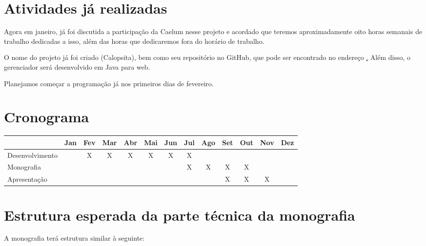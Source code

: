 \documentclass[titlepage]{article}
\begin{document}
\section{Atividades já realizadas}
Agora em janeiro, já foi discutida a participação da Caelum nesse projeto e acordado que teremos aproximadamente oito horas semanais de trabalho dedicadas a isso, além das horas que dedicaremos fora do horário de trabalho.

O nome do projeto já foi criado (Calopsita), bem como seu repositório no GitHub, que pode ser encontrado no endereço \href{git://github.com/caueguerra/calopsita.git}. Além disso, o gerenciador será desenvolvido em Java para web.

Planejamos começar a programação já nos primeiros dias de fevereiro.

\section{Cronograma}
\begin{tabular}{|l|c|c|c|c|c|c|c|c|c|c|c|c|}
  \hline
  & Jan & Fev & Mar & Abr & Mai & Jun & Jul & Ago & Set & Out & Nov & Dez \\ \hline
  Desenvolvimento	&  & X& X& X& X& X& X&  &  &  &  & \\ \hline
  Monografia 		&  &  &  &  &  &  & X& X& X& X&  & \\ \hline
  Apresentação 		&  &  &  &  &  &  &  &  & X& X& X& \\ \hline
\end{tabular}

\section{Estrutura esperada da parte técnica da monografia}

A monografia terá estrutura similar à seguinte:
\end{document}
